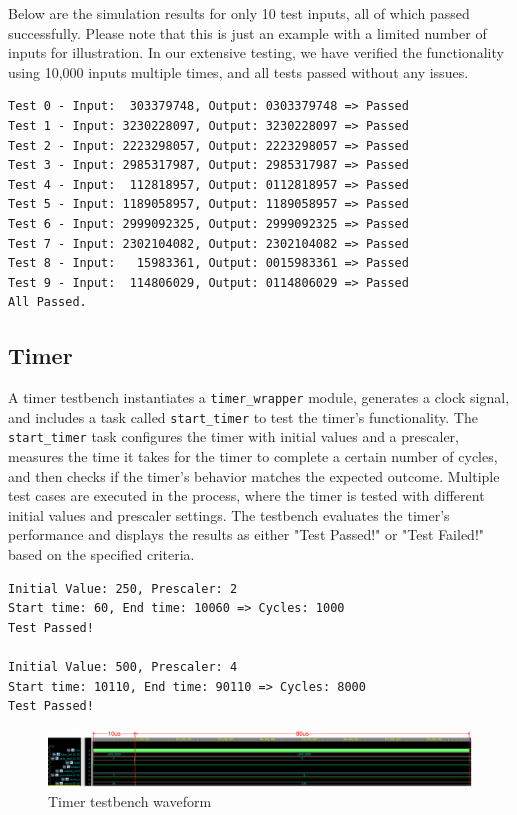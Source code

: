 \documentclass[12pt,a4paper,oneside]{book} %
\begin{document}
Below are the simulation results for only 10 test inputs, all of which passed successfully. Please note that this is just an example with a limited number of inputs for illustration. In our extensive testing, we have verified the functionality using 10,000 inputs multiple times, and all tests passed without any issues.

\begin{verbatim}
Test 0 - Input:  303379748, Output: 0303379748 => Passed
Test 1 - Input: 3230228097, Output: 3230228097 => Passed
Test 2 - Input: 2223298057, Output: 2223298057 => Passed
Test 3 - Input: 2985317987, Output: 2985317987 => Passed
Test 4 - Input:  112818957, Output: 0112818957 => Passed
Test 5 - Input: 1189058957, Output: 1189058957 => Passed
Test 6 - Input: 2999092325, Output: 2999092325 => Passed
Test 7 - Input: 2302104082, Output: 2302104082 => Passed
Test 8 - Input:   15983361, Output: 0015983361 => Passed
Test 9 - Input:  114806029, Output: 0114806029 => Passed
All Passed.
\end{verbatim}

\subsection{Timer}
A timer testbench instantiates a \texttt{timer\_wrapper} module, generates a clock signal, and includes a task called \texttt{start\_timer} to test the timer's functionality. The \texttt{start\_timer} task configures the timer with initial values and a prescaler, measures the time it takes for the timer to complete a certain number of cycles, and then checks if the timer's behavior matches the expected outcome. Multiple test cases are executed in the process, where the timer is tested with different initial values and prescaler settings. The testbench evaluates the timer's performance and displays the results as either "Test Passed!" or "Test Failed!" based on the specified criteria.

\begin{verbatim}
Initial Value: 250, Prescaler: 2
Start time: 60, End time: 10060 => Cycles: 1000
Test Passed!

Initial Value: 500, Prescaler: 4
Start time: 10110, End time: 90110 => Cycles: 8000
Test Passed!
\end{verbatim}

\begin{figure}[H]
    \hspace{-2cm}
    \includegraphics[width=1.2\textwidth]{images/timer_sim_wave.pdf}
    \caption{Timer testbench waveform}
\end{figure}
\end{document}
